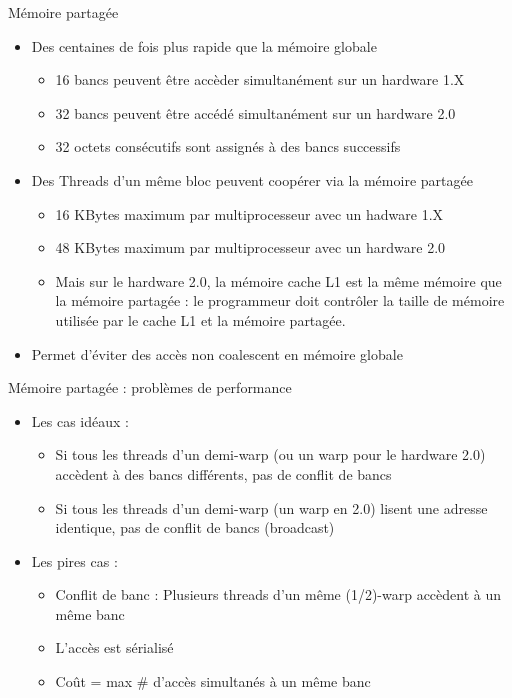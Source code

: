 \documentclass[handout,francais]{beamer}
\begin{document}
\begin{frame}{Mémoire partagée}

\begin{itemize}
\item Des centaines de fois plus rapide que la mémoire globale
  \begin{itemize}
  \item 16 bancs peuvent être accèder simultanément sur
    un hardware 1.X
  \item 32 bancs peuvent être accédé simultanément sur un hardware 2.0
  \item 32 octets consécutifs sont assignés à des bancs successifs
  \end{itemize}
\item Des Threads d'un même bloc peuvent coopérer via la mémoire partagée
  \begin{itemize}
  \item 16 KBytes maximum par multiprocesseur avec un hadware 1.X 
  \item 48 KBytes maximum par multiprocesseur avec un hardware 2.0
  \item Mais sur le hardware 2.0, la mémoire cache L1 est la même mémoire que
    la mémoire partagée : le programmeur doit contrôler la taille de mémoire utilisée
    par le cache L1 et la mémoire partagée.
  \end{itemize}
\item Permet d'éviter des accès non coalescent en mémoire globale  
\end{itemize}
\end{frame}

\begin{frame}{Mémoire partagée : problèmes de performance }

\begin{itemize}
\item Les cas idéaux :
  \begin{itemize}
  \item Si tous les threads d'un demi-warp (ou un warp pour le hardware 2.0)
    accèdent à des bancs différents, pas de conflit de bancs
  \item Si tous les threads d'un demi-warp (un warp en 2.0) lisent une adresse
    identique, pas de conflit de bancs (broadcast)
  \end{itemize}
\item Les pires cas :
  \begin{itemize}
  \item Conflit de banc  : Plusieurs threads d'un même (1/2)-warp accèdent à un même banc
  \item L'accès est sérialisé
  \item Coût = max \# d'accès simultanés à un même banc
  \end{itemize}
\end{itemize}
\end{frame}
\end{document}
